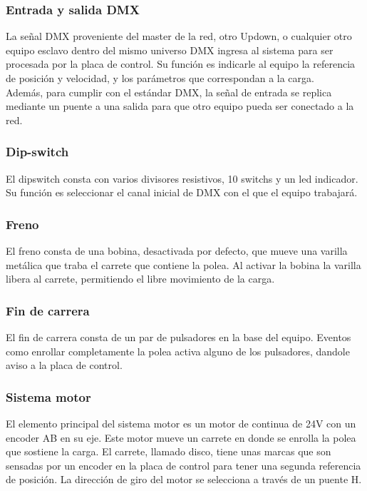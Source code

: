 \subsubsection{Entrada y salida DMX}
La señal DMX proveniente del master de la red, otro Updown, o cualquier otro equipo esclavo dentro del mismo universo DMX ingresa al sistema para ser procesada por la placa de control. Su función es indicarle al equipo la referencia de posición y velocidad, y los parámetros que correspondan a la carga.\\
Además, para cumplir con el estándar DMX, la señal de entrada se replica mediante un puente a una salida para que otro equipo pueda ser conectado a la red.

\subsubsection{Dip-switch}
El dipswitch consta con varios divisores resistivos, 10 switchs y un led indicador. Su función es seleccionar el canal inicial de DMX con el que el equipo trabajará.

\subsubsection{Freno}
El freno consta de una bobina, desactivada por defecto, que mueve una varilla metálica que traba el carrete que contiene la polea. Al activar la bobina la varilla libera al carrete, permitiendo el libre movimiento de la carga.

\subsubsection{Fin de carrera}
El fin de carrera consta de un par de pulsadores en la base del equipo. Eventos como enrollar completamente la polea activa alguno de los pulsadores, dandole aviso a la placa de control.

\subsubsection{Sistema motor}
El elemento principal del sistema motor es un motor de continua de 24V con un encoder AB en su eje. Este motor mueve un carrete en donde se enrolla la polea que sostiene la carga. El carrete, llamado disco, tiene unas marcas que son sensadas por un encoder en la placa de control para tener una segunda referencia de posición. La dirección de giro del motor se selecciona a través de un puente H.

